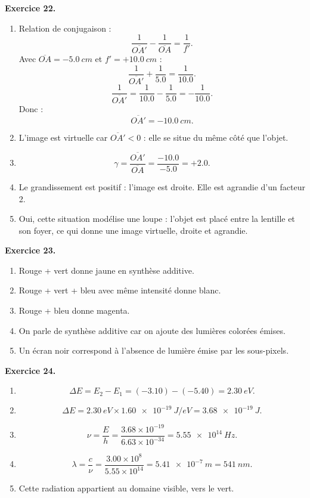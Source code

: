 \documentclass[11pt,a4paper]{article}
\newcommand{\corr}[2]{
  \begin{correctionbox}
  \textbf{Exercice #1.} #2
  \end{correctionbox}
}
\begin{document}
\corr{22}{
\begin{enumerate}
  \item Relation de conjugaison :
  \[
  \frac{1}{\overline{OA'}}-\frac{1}{\overline{OA}}=\frac{1}{f'}.
  \]
  Avec $\overline{OA}=-\SI{5.0}{cm}$ et $f'=+\SI{10.0}{cm}$ :
  \[
  \frac{1}{\overline{OA'}}+\frac{1}{5.0}=\frac{1}{10.0}.
  \]
  \[
  \frac{1}{\overline{OA'}}=\frac{1}{10.0}-\frac{1}{5.0}=-\frac{1}{10.0}.
  \]
  Donc :
  \[
  \overline{OA'}=-\SI{10.0}{cm}.
  \]
  \item L'image est virtuelle car $\overline{OA'}<0$ : elle se situe du même côté que l'objet.
  \item
  \[
  \gamma=\frac{\overline{OA'}}{\overline{OA}}=\frac{-10.0}{-5.0}=+2.0.
  \]
  \item Le grandissement est positif : l'image est droite. Elle est agrandie d'un facteur 2.
  \item Oui, cette situation modélise une loupe : l'objet est placé entre la lentille et son foyer, ce qui donne une image virtuelle, droite et agrandie.
\end{enumerate}
}

\corr{23}{
\begin{enumerate}
  \item Rouge + vert donne jaune en synthèse additive.
  \item Rouge + vert + bleu avec même intensité donne blanc.
  \item Rouge + bleu donne magenta.
  \item On parle de synthèse additive car on ajoute des lumières colorées émises.
  \item Un écran noir correspond à l'absence de lumière émise par les sous-pixels.
\end{enumerate}
}

\corr{24}{
\begin{enumerate}
  \item
  \[
  \Delta E=E_2-E_1=(-3.10)-(-5.40)=\SI{2.30}{eV}.
  \]
  \item
  \[
  \Delta E=\SI{2.30}{eV}\times \SI{1.60e-19}{J/eV}
  =\SI{3.68e-19}{J}.
  \]
  \item
  \[
  \nu=\frac{E}{h}
  =\frac{3.68\times 10^{-19}}{6.63\times 10^{-34}}
  =\SI{5.55e14}{Hz}.
  \]
  \item
  \[
  \lambda=\frac{c}{\nu}
  =\frac{3.00\times 10^8}{5.55\times 10^{14}}
  =\SI{5.41e-7}{m}
  =\SI{541}{nm}.
  \]
  \item Cette radiation appartient au domaine visible, vers le vert.
\end{enumerate}
}
\end{document}
